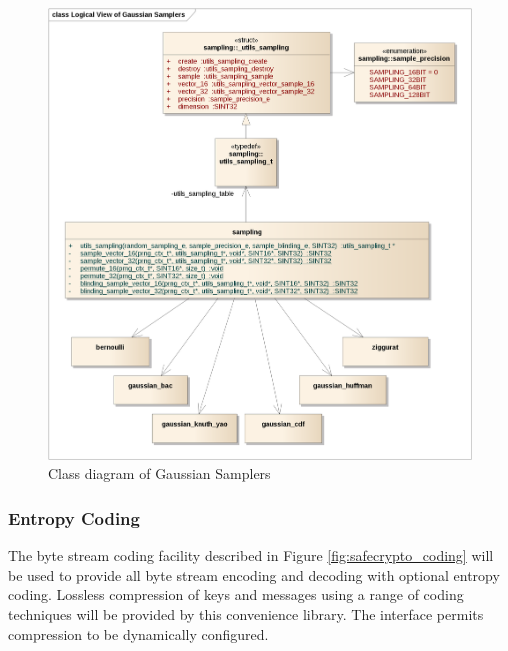 \begin{figure}[!h]
\centering
\includegraphics[width=\textwidth]{libsafecrypto_sampling_logical_view.png}
\caption{Class diagram of Gaussian Samplers}
\label{fig:safecrypto_sampling}
\end{figure}


\clearpage
\subsubsection{Entropy Coding}

The byte stream coding facility described in Figure \ref{fig:safecrypto_coding} will be used to provide all byte stream encoding and decoding with optional entropy coding. Lossless compression of keys and messages using a range of coding techniques will be provided by this convenience library. The interface permits compression to be dynamically configured.

